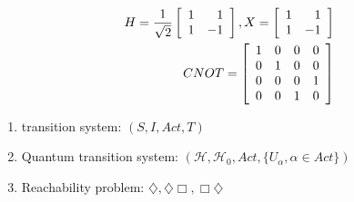 \documentclass[aspectratio=1610,18pt]{ctexbeamer}
\begin{document}
\begin{frame}
  \begin{align}
    H=\frac{1}{\sqrt{2}}\left[\begin{array}{rr}
    1 & 1 \\
    1 & -1
    \end{array}\right],
    X=\left[\begin{array}{rr}
      1 & 1 \\
      1 & -1
      \end{array}\right]
    \\\notag
    CNOT=\left[\begin{array}{llll}
    1 & 0 & 0 & 0 \\
    0 & 1 & 0 & 0 \\
    0 & 0 & 0 & 1 \\
    0 & 0 & 1 & 0
    \end{array}\right]\notag
  \end{align}
\end{frame}
\begin{frame}
  \begin{enumerate}
    \Large
    \item  transition system: $(S, I, Act, T)$
    \item Quantum transition system: $(\mathcal{H}, \mathcal{H}_0, Act, \{U_\alpha,\alpha\in Act\})$
    \item Reachability problem: $\diamondsuit,\diamondsuit\Box,\Box\diamondsuit $
  \end{enumerate}
\end{frame}
\begin{frame}
\end{frame}
\end{document}
